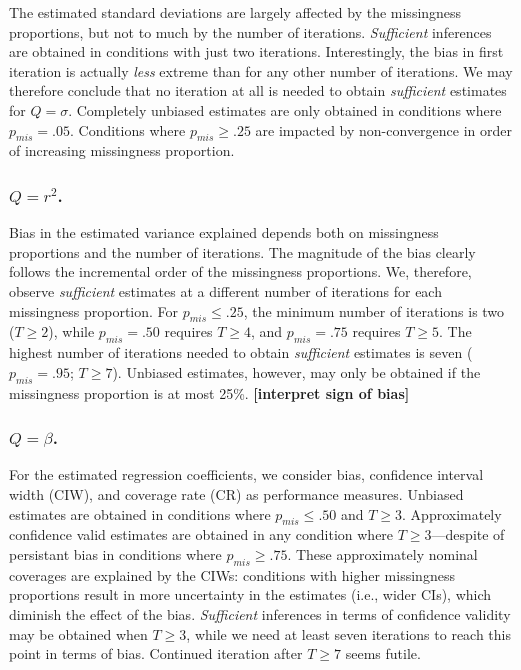 \documentclass[Royal,times,sageh]{sagej}
\begin{document}
The estimated standard deviations are largely affected by the missingness proportions, but not to much by the number of iterations. \emph{Sufficient} inferences are obtained in conditions with just two iterations. Interestingly, the bias in first iteration is actually \emph{less} extreme than for any other number of iterations. We may therefore conclude that no iteration at all is needed to obtain \emph{sufficient} estimates for \(Q=\sigma\). Completely unbiased estimates are only obtained in conditions where \(p_{mis}=.05\). Conditions where \(p_{mis}\geq.25\) are impacted by non-convergence in order of increasing missingness proportion.

\hypertarget{qr2.}{%
\subsubsection{\texorpdfstring{\(Q=r^2\).}{Q=r\^{}2.}}\label{qr2.}}

Bias in the estimated variance explained depends both on missingness proportions and the number of iterations. The magnitude of the bias clearly follows the incremental order of the missingness proportions. We, therefore, observe \emph{sufficient} estimates at a different number of iterations for each missingness proportion. For \(p_{mis}\leq.25\), the minimum number of iterations is two (\(T\geq2\)), while \(p_{mis}=.50\) requires \(T\geq4\), and \(p_{mis}=.75\) requires \(T\geq5\). The highest number of iterations needed to obtain \emph{sufficient} estimates is seven (\(p_{mis}=.95\); \(T\geq7\)). Unbiased estimates, however, may only be obtained if the missingness proportion is at most 25\%. \textbf{{[}interpret sign of bias{]}}

\hypertarget{qbeta.}{%
\subsubsection{\texorpdfstring{\(Q=\beta\).}{Q=\textbackslash beta.}}\label{qbeta.}}

For the estimated regression coefficients, we consider bias, confidence interval width (CIW), and coverage rate (CR) as performance measures. Unbiased estimates are obtained in conditions where \(p_{mis}\leq.50\) and \(T\geq3\). Approximately confidence valid estimates are obtained in any condition where \(T\geq3\)---despite of persistant bias in conditions where \(p_{mis}\geq.75\). These approximately nominal coverages are explained by the CIWs: conditions with higher missingness proportions result in more uncertainty in the estimates (i.e., wider CIs), which diminish the effect of the bias. \emph{Sufficient} inferences in terms of confidence validity may be obtained when \(T\geq3\), while we need at least seven iterations to reach this point in terms of bias. Continued iteration after \(T\geq7\) seems futile.
\end{document}
